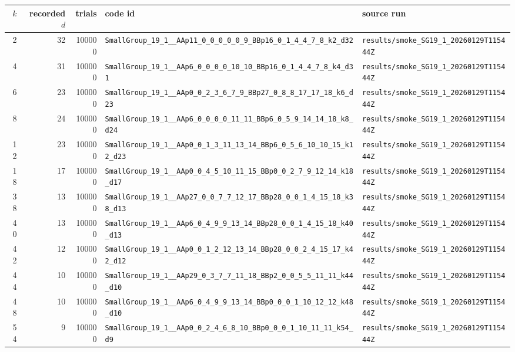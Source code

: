 \documentclass[11pt]{article}
\begin{document}
\begin{longtable}{@{}r r r l l@{}}
\toprule
$k$ & recorded $d$ & trials & code id & source run \\
\midrule
\endhead
2 & 32 & 100000 & \texttt{SmallGroup\_19\_1\_\_AAp11\_0\_0\_0\_0\_0\_9\_BBp16\_0\_1\_4\_4\_7\_8\_k2\_d32} & \texttt{results/smoke\_SG19\_1\_20260129T115444Z} \\
4 & 31 & 100000 & \texttt{SmallGroup\_19\_1\_\_AAp6\_0\_0\_0\_0\_10\_10\_BBp16\_0\_1\_4\_4\_7\_8\_k4\_d31} & \texttt{results/smoke\_SG19\_1\_20260129T115444Z} \\
6 & 23 & 100000 & \texttt{SmallGroup\_19\_1\_\_AAp0\_0\_2\_3\_6\_7\_9\_BBp27\_0\_8\_8\_17\_17\_18\_k6\_d23} & \texttt{results/smoke\_SG19\_1\_20260129T115444Z} \\
8 & 24 & 100000 & \texttt{SmallGroup\_19\_1\_\_AAp6\_0\_0\_0\_0\_11\_11\_BBp6\_0\_5\_9\_14\_14\_18\_k8\_d24} & \texttt{results/smoke\_SG19\_1\_20260129T115444Z} \\
12 & 23 & 100000 & \texttt{SmallGroup\_19\_1\_\_AAp0\_0\_1\_3\_11\_13\_14\_BBp6\_0\_5\_6\_10\_10\_15\_k12\_d23} & \texttt{results/smoke\_SG19\_1\_20260129T115444Z} \\
18 & 17 & 100000 & \texttt{SmallGroup\_19\_1\_\_AAp0\_0\_4\_5\_10\_11\_15\_BBp0\_0\_2\_7\_9\_12\_14\_k18\_d17} & \texttt{results/smoke\_SG19\_1\_20260129T115444Z} \\
38 & 13 & 100000 & \texttt{SmallGroup\_19\_1\_\_AAp27\_0\_0\_7\_7\_12\_17\_BBp28\_0\_0\_1\_4\_15\_18\_k38\_d13} & \texttt{results/smoke\_SG19\_1\_20260129T115444Z} \\
40 & 13 & 100000 & \texttt{SmallGroup\_19\_1\_\_AAp6\_0\_4\_9\_9\_13\_14\_BBp28\_0\_0\_1\_4\_15\_18\_k40\_d13} & \texttt{results/smoke\_SG19\_1\_20260129T115444Z} \\
42 & 12 & 100000 & \texttt{SmallGroup\_19\_1\_\_AAp0\_0\_1\_2\_12\_13\_14\_BBp28\_0\_0\_2\_4\_15\_17\_k42\_d12} & \texttt{results/smoke\_SG19\_1\_20260129T115444Z} \\
44 & 10 & 100000 & \texttt{SmallGroup\_19\_1\_\_AAp29\_0\_3\_7\_7\_11\_18\_BBp2\_0\_0\_5\_5\_11\_11\_k44\_d10} & \texttt{results/smoke\_SG19\_1\_20260129T115444Z} \\
48 & 10 & 100000 & \texttt{SmallGroup\_19\_1\_\_AAp6\_0\_4\_9\_9\_13\_14\_BBp0\_0\_0\_1\_10\_12\_12\_k48\_d10} & \texttt{results/smoke\_SG19\_1\_20260129T115444Z} \\
54 & 9 & 100000 & \texttt{SmallGroup\_19\_1\_\_AAp0\_0\_2\_4\_6\_8\_10\_BBp0\_0\_0\_1\_10\_11\_11\_k54\_d9} & \texttt{results/smoke\_SG19\_1\_20260129T115444Z} \\
\bottomrule
\end{longtable}
\end{document}
